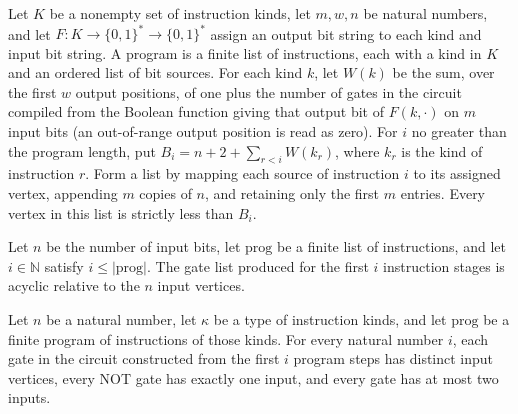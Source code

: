 \begin{theorem}
\label{BoolCircuit.srcVertices_lt}
\leanok
{}
Let $K$ be a nonempty set of instruction kinds, let $m,w,n$ be natural numbers, and let
$F:K\to\{0,1\}^*\to\{0,1\}^*$ assign an output bit string to each kind and input bit
string. A program is a finite list of instructions, each with a kind in $K$ and an
ordered list of bit sources. For each kind $k$, let $W(k)$ be the sum, over the first
$w$ output positions, of one plus the number of gates in the circuit compiled from the
Boolean function giving that output bit of $F(k,\cdot)$ on $m$ input bits (an
out-of-range output position is read as zero). For $i$ no greater than the program
length, put $B_i=n+2+\sum_{r<i}W(k_r)$, where $k_r$ is the kind of instruction $r$. Form
a list by mapping each source of instruction $i$ to its assigned vertex, appending $m$
copies of $n$, and retaining only the first $m$ entries. Every vertex in this list is
strictly less than $B_i$.
\end{theorem}

\begin{theorem}
\label{BoolCircuit.gatesAcyclic_progGates}
\leanok
{}
Let $n$ be the number of input bits, let $\mathrm{prog}$ be a finite list of
instructions, and let $i\in\mathbb{N}$ satisfy $i\leq |\mathrm{prog}|$. The gate list
produced for the first $i$ instruction stages is acyclic relative to the $n$ input
vertices.
\end{theorem}

\begin{theorem}
\label{BoolCircuit.faninTwo_progGates}
\leanok
{}
Let $n$ be a natural number, let $\kappa$ be a type of instruction kinds, and let
$\mathrm{prog}$ be a finite program of instructions of those kinds. For every natural
number $i$, each gate in the circuit constructed from the first $i$ program steps has
distinct input vertices, every NOT gate has exactly one input, and every gate has at
most two inputs.
\end{theorem}

